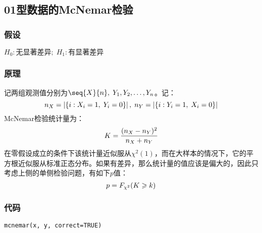 \subsection{01型数据的McNemar检验}
\subsubsection{假设}
$H_0:\text{无显著差异};\;H_1:\text{有显著差异}$
\subsubsection{原理}
记两组观测值分别为$\seq{X}{n},\;Y_1,Y_2,\dots,Y_n$。记：
\begin{equation}
	n_X=\left|\{i:X_i=1,\;Y_i=0\}\right|,\;
	n_Y=\left|\{i:Y_i=1,\;X_i=0\}\right|\notag
\end{equation}
\hspace{2em}McNemar检验统计量为：
\begin{equation}
	K=\frac{(n_X-n_Y)^2}{n_X+n_Y}\notag
\end{equation}
\hspace{2em}在零假设成立的条件下该统计量近似服从$\chi^2(1)$，而在大样本的情况下，它的平方根近似服从标准正态分布。如果有差异，那么统计量的值应该是偏大的，因此只考虑上侧的单侧检验问题，有如下$p$值：
\begin{equation}
	p=F_{\chi^2}(K\geqslant k)\notag
\end{equation}

\subsubsection{代码}
\begin{verbatim}
mcnemar(x, y, correct=TRUE)
\end{verbatim}
